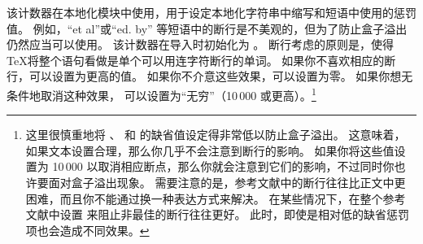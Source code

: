 \begin{ltxsyntax}

该计数器在本地化模块中使用，用于设定本地化字符串中缩写和短语中使用的惩罚值。
例如，“et al”或“ed. by” 等短语中的断行是不美观的，但为了防止盒子溢出仍然应当可以使用。
该计数器在导入时初始化为 。
断行考虑的原则是，使得 \TeX 将整个语句看做是单个可以用连字符断行的单词。
如果你不喜欢相应的断行，可以设置为更高的值。
如果你不介意这些效果，可以设置为零。
如果你想无条件地取消这种效果，
可以设置为“无穷”（10\,000 或更高）。\footnote{%
这里很慎重地将 、 和  的缺省值设定得非常低以防止盒子溢出。
这意味着，如果文本设置合理，那么你几乎不会注意到断行的影响。
如果你将这些值设置为 10\,000 以取消相应断点，那么你就会注意到它们的影响，不过同时你也许要面对盒子溢出现象。
需要注意的是，参考文献中的断行往往比正文中更困难，而且你不能通过换一种表达方式来解决。
在某些情况下，在整个参考文献中设置  来阻止非最佳的断行往往更好。
此时，即使是相对低的缺省惩罚项也会造成不同效果。}




\end{ltxsyntax}
